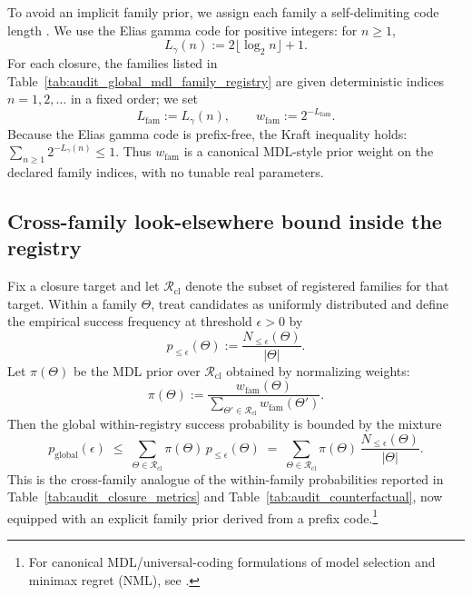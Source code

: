 To avoid an implicit family prior, we assign each family a self-delimiting code length \cite{Rissanen1978MDL}.
We use the Elias gamma code for positive integers: for $n\ge 1$,
\begin{equation}
\label{eq:elias_gamma_length}
L_\gamma(n):=2\lfloor \log_2 n\rfloor + 1.
\end{equation}
For each closure, the families listed in Table~\ref{tab:audit_global_mdl_family_registry} are given deterministic indices $n=1,2,\dots$ in a fixed order; we set
\begin{equation}
\label{eq:mdl_family_weight}
L_{\mathrm{fam}}:=L_\gamma(n),
\qquad
w_{\mathrm{fam}}:=2^{-L_{\mathrm{fam}}}.
\end{equation}
Because the Elias gamma code is prefix-free, the Kraft inequality holds:
$\sum_{n\ge 1}2^{-L_\gamma(n)}\le 1$.
Thus $w_{\mathrm{fam}}$ is a canonical MDL-style prior weight on the declared family indices, with no tunable real parameters.

\subsection{Cross-family look-elsewhere bound inside the registry}
\label{subsec:mdl_global_bound}

Fix a closure target and let $\mathcal{R}_{\mathrm{cl}}$ denote the subset of registered families for that target.
Within a family $\Theta$, treat candidates as uniformly distributed and define the empirical success frequency at threshold $\epsilon>0$ by
\[
p_{\le\epsilon}(\Theta):=\frac{N_{\le\epsilon}(\Theta)}{|\Theta|}.
\]
Let $\pi(\Theta)$ be the MDL prior over $\mathcal{R}_{\mathrm{cl}}$ obtained by normalizing weights:
\[
\pi(\Theta):=\frac{w_{\mathrm{fam}}(\Theta)}{\sum_{\Theta'\in\mathcal{R}_{\mathrm{cl}}} w_{\mathrm{fam}}(\Theta')}.
\]
Then the global within-registry success probability is bounded by the mixture
\begin{equation}
\label{eq:mdl_mixture_bound}
p_{\mathrm{global}}(\epsilon)
\;\le\;
\sum_{\Theta\in\mathcal{R}_{\mathrm{cl}}}\pi(\Theta)\,p_{\le\epsilon}(\Theta)
\;=\;
\sum_{\Theta\in\mathcal{R}_{\mathrm{cl}}}\pi(\Theta)\,\frac{N_{\le\epsilon}(\Theta)}{|\Theta|}.
\end{equation}
This is the cross-family analogue of the within-family probabilities reported in Table~\ref{tab:audit_closure_metrics} and Table~\ref{tab:audit_counterfactual}, now equipped with an explicit family prior derived from a prefix code.\footnote{For canonical MDL/universal-coding formulations of model selection and minimax regret (NML), see \cite{Rissanen1978MDL,Shtarkov1987NML,HansenYu2001MDL}.}

